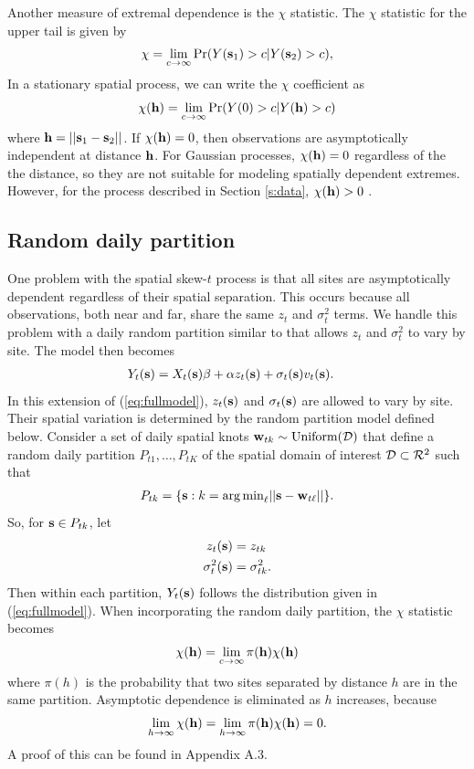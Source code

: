 \documentclass[11pt]{article}
\begin{document}
Another measure of extremal dependence is the $\chi$ statistic.
The $\chi$ statistic for the upper tail is given by
\begin{align*}
  \chi = \lim_{c \rightarrow \infty} \Pr(Y(\mbox{\bf s}_1) > c | Y(\mbox{\bf s}_2) > c),
\end{align*}
In a stationary spatial process, we can write the $\chi$ coefficient as
\begin{align*}
  \chi(\mbox{\bf h}) = \lim_{c \rightarrow \infty} \Pr(Y(0) > c | Y(\mbox{\bf h}) > c)
\end{align*}
where $\mbox{\bf h} = ||\mbox{\bf s}_1 - \mbox{\bf s}_2||$.
If $\chi(\mbox{\bf h}) = 0$, then observations are asymptotically independent at distance $\mbox{\bf h}$.
For Gaussian processes, $\chi(\mbox{\bf h}) = 0$ regardless of the the distance, so they are not suitable for modeling spatially dependent extremes.
However, for the process described in Section \ref{s:data}, $\chi(\mbox{\bf h}) > 0$ \citep{Padoan2011}.

\subsection{Random daily partition}\label{s:part}
One problem with the spatial skew-$t$ process is that all sites are asymptotically dependent regardless of their spatial separation.
This occurs because all observations, both near and far, share the same $z_t$ and $\sigma^2_t$ terms.
We handle this problem with a daily random partition similar to \citet{Huser2014} that allows $z_t$ and $\sigma^2_t$ to vary by site.
The model then becomes
\begin{align}
  Y_t(\mbox{\bf s}) &= X_t(\mbox{\bf s}) \beta + \alpha z_t(\mbox{\bf s}) + \sigma_t(\mbox{\bf s}) v_t(\mbox{\bf s}).
\end{align}
In this extension of (\ref{eq:fullmodel}), $z_t(\mbox{\bf s})$ and $\sigma_t(\mbox{\bf s})$ are allowed to vary by site.
Their spatial variation is determined by the random partition model defined below.
Consider a set of daily spatial knots $\mbox{\bf w}_{tk} \sim \text{Uniform}({\cal D})$ that define a random daily partition $P_{t1}, \ldots, P_{tK}$ of the spatial domain of interest ${\cal D} \subset {\cal R}^2$ such that
\begin{align*}
  P_{tk} = \{ \mbox{\bf s} : k = {\mathop{\rm arg\, min}}_\ell || \mbox{\bf s} - \mbox{\bf w}_{t\ell} || \}.
\end{align*}
So, for $\mbox{\bf s} \in P_{tk}$, let
\begin{align}
  z_t(\mbox{\bf s}) &= z_{tk} \label{eq:sitez}\\
  \sigma^2_t(\mbox{\bf s}) &= \sigma^2_{tk} \label{eq:sitesig}.
\end{align}
Then within each partition, $Y_t(\mbox{\bf s})$ follows the distribution given in (\ref{eq:fullmodel}).
When incorporating the random daily partition, the $\chi$ statistic becomes
\begin{align}
  \chi(\mbox{\bf h}) = \lim_{c \rightarrow \infty} \pi(\mbox{\bf h}) \chi(\mbox{\bf h})
\end{align}
where $\pi(h)$ is the probability that two sites separated by distance $h$ are in the same partition.
Asymptotic dependence is eliminated as $h$ increases, because
\begin{align}
  \lim_{h \rightarrow \infty} \chi(\mbox{\bf h}) = \lim_{h \rightarrow \infty} \pi(\mbox{\bf h}) \chi(\mbox{\bf h}) = 0.
\end{align}
A proof of this can be found in Appendix A.3.
\end{document}
